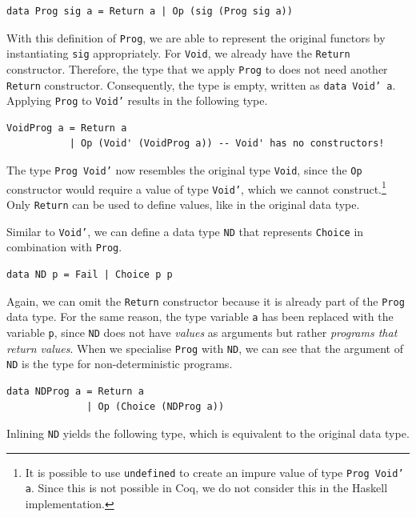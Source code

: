 \documentclass[a4paper, 11pt, fleqn, twoside]{scrreprt}
\newcommand{\hinl}[1]{\texttt{#1}}
\newcommand{\cinl}[1]{\texttt{#1}}
\begin{document}
\begin{verbatim}
data Prog sig a = Return a | Op (sig (Prog sig a))
\end{verbatim}

With this definition of \hinl{Prog}, we are able to represent the original functors by instantiating \hinl{sig} appropriately.
For \hinl{Void}, we already have the \hinl{Return} constructor.
Therefore, the type that we apply \hinl{Prog} to does not need another \hinl{Return} constructor.
Consequently, the type is empty, written as \hinl{data Void' a}.
Applying \cinl{Prog} to \cinl{Void'} results in the following type.

\begin{verbatim}
VoidProg a = Return a
           | Op (Void' (VoidProg a)) -- Void' has no constructors!
\end{verbatim}

The type \hinl{Prog Void'} now resembles the original type \hinl{Void}, since the \hinl{Op} constructor would require a value of type \hinl{Void'}, which we cannot construct.\footnote{It is possible to use \texttt{undefined} to create an impure value of type \texttt{Prog Void' a}.
Since this is not possible in Coq, we do not consider this in the Haskell implementation.}
Only \hinl{Return} can be used to define values, like in the  original data type.

Similar to \hinl{Void'}, we can define a data type \hinl{ND} that represents \hinl{Choice} in combination with \hinl{Prog}.

\label{min:ND}
\begin{verbatim}
data ND p = Fail | Choice p p
\end{verbatim}

Again, we can omit the \hinl{Return} constructor because it is  already part of the \hinl{Prog} data type.
For the same reason,  the type variable \hinl{a} has been replaced with the variable \hinl{p}, since \hinl{ND} does not have \textit{values} as arguments but rather \textit{programs that return values}.
When we specialise \hinl{Prog} with \hinl{ND}, we can see that the argument of \hinl{ND} is the type for non-deterministic programs.

\begin{verbatim}
data NDProg a = Return a
              | Op (Choice (NDProg a))
\end{verbatim}

Inlining \hinl{ND} yields the following type, which is equivalent to the original data type.
\end{document}
